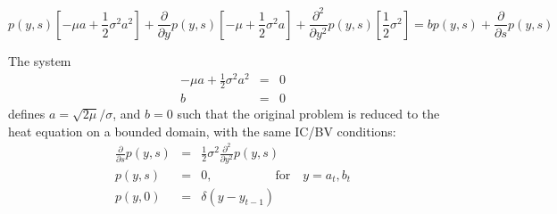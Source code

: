 \begin{equation}
 p(y,s)\left[ -\mu a + \frac{1}{2}\sigma^2 a^2 \right] + \frac{\partial}{\partial y} p(y,s)\left[ -\mu + \frac{1}{2}\sigma^2 a \right] + \frac{\partial^2}{\partial y^2} p(y,s) \left[ \frac{1}{2}\sigma^2 \right] = bp(y,s) + \frac{\partial}{\partial s}p(y,s) 
\end{equation}

The system 
\begin{eqnarray}
	-\mu a + \frac{1}{2}\sigma^2 a^2 &=& 0 \label{eq:a} \\
	b &=& 0 \label{eq:b}
\end{eqnarray}
defines $a = \sqrt{2\mu}/\sigma$, and $b=0$ such that the original problem is reduced to the heat equation on a bounded domain, with the same IC/BV conditions:
\begin{eqnarray} 
\frac{\partial}{\partial s}p(y,s) &=& \frac{1}{2}\sigma^2 \frac{\partial^2}{\partial y^2} p(y,s)  \label{eq:heat1} \\
					p(y,s) &=& 0, \qquad \qquad \quad \mbox{for}  \quad y = a_t, b_t \label{eq:heat2} \\
					p(y,0) &=& \delta(y-y_{t-1})  \label{eq:heat3}
\end{eqnarray}




